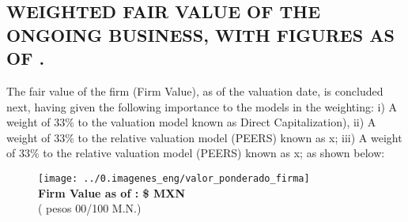 
\newcommand{\ponda}{Direct Capitalization)}
\newcommand{\pondaPorcentage}{33}
\newcommand{\pondb}{\peersa}
\newcommand{\pondbPorcentage}{33}
\newcommand{\pondc}{\peersb}
\newcommand{\pondcPorcentage}{33}
\newcommand{\pondd}{\peersd}
\newcommand{\ponddPorcentage}{30}
\newcommand{\ponde}{\peersd}
\newcommand{\pondePorcentage}{30}

\subsection{WEIGHTED FAIR VALUE OF THE ONGOING BUSINESS, WITH FIGURES AS OF \fechaValoresCorto.}


The fair value of the firm (Firm Value), as of the valuation date, is concluded next, having given the following importance to the models in the weighting: i) A weight of \pondaPorcentage\% to the valuation model known as \ponda{}, ii) A weight of \pondbPorcentage\%  to the relative valuation model (PEERS) known as \pondb{} x; iii) A weight of \pondcPorcentage\%  to the relative valuation model (PEERS) known as \pondc{} x; as shown below:

\begin{figure}[H]
\centering
\texttt{[image: ../0.imagenes\_eng/valor\_ponderado\_firma]}\\

\textbf{\textcolor{principal}{Firm Value as of  \fechaValoresCorto:} \$\valorFirma{} MXN}\\[5pt]
(\textcolor{principal}{\valorFirmaLetra{} pesos 00/100 M.N.})
\end{figure}
